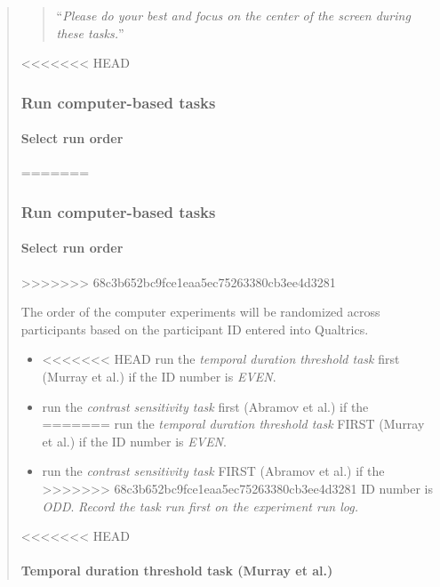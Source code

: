 \documentclass[]{article}
\providecommand{\tightlist}{%
  \setlength{\itemsep}{0pt}\setlength{\parskip}{0pt}}
\let\oldparagraph\paragraph
\renewcommand{\paragraph}[1]{\oldparagraph{#1}\mbox{}}
\begin{document}
\begin{quote}
\begin{quote}
``\emph{Please do your best and focus on the center of the screen during
these tasks.}''
\end{quote}

<<<<<<< HEAD
\subsubsection{Run computer-based tasks}\label{run-computer-based-tasks}

\paragraph{Select run order}\label{select-run-order}
=======
\hypertarget{run-computer-based-tasks}{%
\subsubsection{Run computer-based
tasks}\label{run-computer-based-tasks}}

\hypertarget{select-run-order}{%
\paragraph{Select run order}\label{select-run-order}}
>>>>>>> 68c3b652bc9fce1eaa5ec75263380cb3ee4d3281

The order of the computer experiments will be randomized across
participants based on the participant ID entered into Qualtrics.

\begin{itemize}
\tightlist
\item
<<<<<<< HEAD
  run the \emph{temporal duration threshold task} first (Murray et al.)
  if the ID number is \emph{EVEN}.
\item
  run the \emph{contrast sensitivity task} first (Abramov et al.) if the
=======
  run the \emph{temporal duration threshold task} FIRST (Murray et al.)
  if the ID number is \emph{EVEN}.
\item
  run the \emph{contrast sensitivity task} FIRST (Abramov et al.) if the
>>>>>>> 68c3b652bc9fce1eaa5ec75263380cb3ee4d3281
  ID number is \emph{ODD}. \emph{Record the task run first on the
  experiment run log.}
\end{itemize}

<<<<<<< HEAD
\paragraph{Temporal duration threshold task (Murray et
al.)}\label{temporal-duration-threshold-task-murray-et-al.}


\end{quote}
\end{document}
